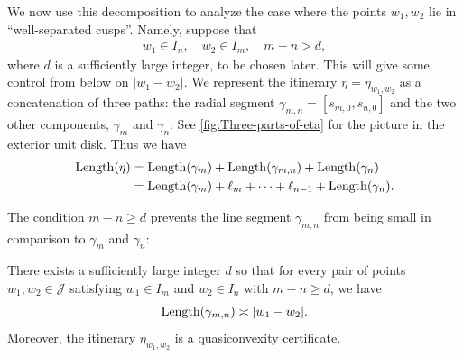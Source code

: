 We now use this decomposition to analyze the case where the points $w_1,w_2$ lie in ``well-separated cusps''. Namely, suppose that
\begin{align} \label{parabolic separation}
	w_1 \in I_n, \quad w_2 \in I_m, \quad m-n > d,
\end{align}
where $d$ is a sufficiently large integer, to be chosen later. 
This will give some control from below on $|w_1-w_2|$. 
We represent the itinerary $\eta=\eta_{w_1,w_2}$ as a concatenation of three paths: the radial segment $\gamma_{m,n}=[s_{m,0},s_{n,0}]$ and the two other components, $\gamma _m$ and $\gamma_n$. See \cref{fig:Three-parts-of-eta} for the picture in the exterior unit disk.
Thus we have
\begin{equation}
\begin{split}    
\operatorname{Length}(\eta) &=\operatorname{Length}(\gamma_m)+\operatorname{Length}(\gamma_{m,n})+\operatorname{Length}(\gamma_n) \\ 
&= \operatorname{Length}(\gamma_m)+\ell_m + \dots +\ell_{n-1}+\operatorname{Length}(\gamma_n).
\end{split}
\end{equation}



The condition $m-n \geq d$ prevents the line segment $\gamma _{m,n}$ from being small in comparison to $\gamma_m$ and $\gamma_n$:
\begin{proposition}
\label {case-3-proof}
There exists a sufficiently large integer $d$ so that for every pair of points $w_1,w_2 \in \mathcal J$ satisfying $w_1\in I_m$ and $w_2 \in I_n$ with $m-n \geq d$, we have
	\begin{equation}
	\label{eq:triangle-comparison}
		\operatorname{Length}(\gamma_{m,n}) \asymp |w_1-w_2|.
	\end{equation}
Moreover, the itinerary $\eta_{w_1,w_2}$ is a quasiconvexity certificate.
\end{proposition}

